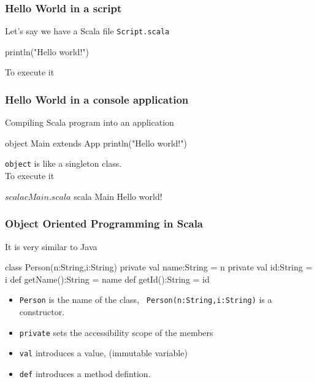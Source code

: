 \documentclass{beamer}
\newcommand{\beb}{\begin{exampleblock}}
\newcommand{\eeb}{\end{exampleblock}}
\begin{document}
\begin{frame}[fragile]
\frametitle{Hello World in a script}
Let's say we have a Scala file {\tt Script.scala}
\beb{}
\begin{code}
println("Hello world!")
\end{code}
\eeb
To execute it
\end{frame}

\begin{frame}[fragile]
\frametitle{Hello World in a console application}
Compiling Scala program into an application
\beb{}
\begin{code}
object Main extends App 
{
    println("Hello world!")
}
\end{code}
\eeb
{\tt object} is like a singleton class.  \\
To execute it
\begin{code}
$ scalac Main.scala
$ scala Main
Hello world!
\end{code}

\end{frame}

\begin{frame}[fragile]
\frametitle{Object Oriented Programming in Scala}
It is very similar to Java
\beb{}
\begin{code}
class Person(n:String,i:String) {
   private val name:String = n
   private val id:String   = i
   def getName():String = name
   def getId():String = id
}
\end{code}
\eeb
\begin{itemize}
 \item {\tt Person} is the name of the class, {\tt
     Person(n:String,i:String)} is a constructor.
 \item {\tt private} sets the accessibility scope of the members
 \item {\tt val} introduces a value, (immutable variable)
 \item {\tt def} introduces a method defintion.
\end{itemize}
\end{frame}
\end{document}
